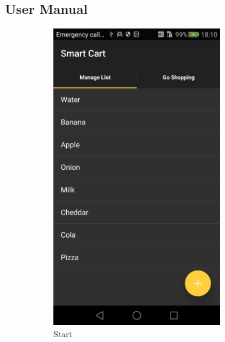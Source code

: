 \subsection{User Manual}


\begin{figure}[h]
\captionsetup{justification=centering}
\begin{subfigure}{0.475\textwidth} 
\includegraphics[width=0.8\textwidth, height=
0.35\textheight]{res/usermanual/startApp.png}
\caption{Start}
\label{fig:start}
\end{subfigure} \hspace{0.2\textwidth}
\begin{subfigure}{0.475\textwidth}

\end{subfigure}
\end{figure}
